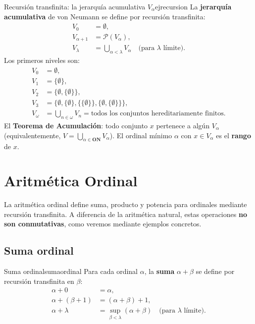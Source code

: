 \begin{ejemplo}{Recursión transfinita: la jerarquía acumulativa $V_\alpha$}{ejrecursion}
La \textbf{jerarquía acumulativa} de von Neumann se define por recursión transfinita:
\begin{align*}
  V_0 &= \emptyset,\\
  V_{\alpha+1} &= \mathcal{P}(V_\alpha),\\
  V_\lambda &= \bigcup_{\alpha < \lambda} V_\alpha \quad\text{(para } \lambda \text{ límite)}.
\end{align*}
Los primeros niveles son:
\begin{align*}
  V_0 &= \emptyset,\\
  V_1 &= \{\emptyset\},\\
  V_2 &= \{\emptyset, \{\emptyset\}\},\\
  V_3 &= \{\emptyset, \{\emptyset\}, \{\{\emptyset\}\}, \{\emptyset, \{\emptyset\}\}\},\\
  V_\omega &= \bigcup_{n \in \omega} V_n = \text{todos los conjuntos hereditariamente finitos}.
\end{align*}
El \textbf{Teorema de Acumulación}: todo conjunto $x$ pertenece a algún $V_\alpha$ (equivalentemente, $V = \bigcup_{\alpha \in \mathbf{ON}} V_\alpha$). El ordinal mínimo $\alpha$ con $x \in V_\alpha$ es el \textbf{rango} de $x$.
\end{ejemplo}

\section{Aritmética Ordinal}

La aritmética ordinal define suma, producto y potencia para ordinales mediante recursión transfinita. A diferencia de la aritmética natural, estas operaciones \textbf{no son conmutativas}, como veremos mediante ejemplos concretos.

\subsection{Suma ordinal}

\begin{definicion}{Suma ordinal}{sumaordinal}
Para cada ordinal $\alpha$, la \textbf{suma} $\alpha + \beta$ se define por recursión transfinita en $\beta$:
\begin{align*}
  \alpha + 0 &= \alpha,\\
  \alpha + (\beta + 1) &= (\alpha + \beta) + 1,\\
  \alpha + \lambda &= \sup_{\beta < \lambda}(\alpha + \beta) \quad\text{(para } \lambda \text{ límite)}.
\end{align*}
\end{definicion}

